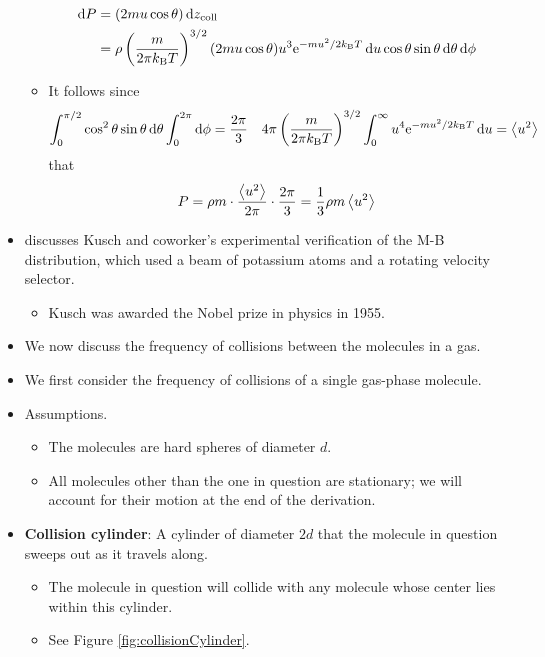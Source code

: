 \documentclass[../notes.tex]{subfiles}
\begin{document}
\begin{itemize}
\begin{itemize}
\begin{align*}
            \dd{P} &= (2mu\cos\theta)\dd{z_\text{coll}}\\
            &= \rho\left( \frac{m}{2\pi\kB T} \right)^{3/2}(2mu\cos\theta)u^3\e[-mu^2/2\kB T]\dd{u}\cos\theta\sin\theta\dd{\theta}\dd{\phi}
        \end{align*}
        \item It follows since
        \begin{align*}
            \int_0^{\pi/2}\cos^2\theta\sin\theta\dd{\theta}\int_0^{2\pi}\dd{\phi} &= \frac{2\pi}{3}&
            4\pi\left( \frac{m}{2\pi\kB T} \right)^{3/2}\int_0^\infty u^4\e[-mu^2/2\kB T]\dd{u} &= \prb{u^2}
        \end{align*}
        that
        \begin{equation*}
            P = \rho m\cdot\frac{\prb{u^2}}{2\pi}\cdot\frac{2\pi}{3}
            = \frac{1}{3}\rho m\prb{u^2}
        \end{equation*}
    \end{itemize}
    \item {}\textcite{bib:McQuarrieSimon} discusses Kusch and coworker's experimental verification of the M-B distribution, which used a beam of potassium atoms and a rotating velocity selector.
    \begin{itemize}
        \item Kusch was awarded the Nobel prize in physics in 1955.
    \end{itemize}
    \item We now discuss the frequency of collisions between the molecules in a gas.
    \item We first consider the frequency of collisions of a single gas-phase molecule.
    \item Assumptions.
    \begin{itemize}
        \item The molecules are hard spheres of diameter $d$.
        \item All molecules other than the one in question are stationary; we will account for their motion at the end of the derivation.
    \end{itemize}
    \item \textbf{Collision cylinder}: A cylinder of diameter $2d$ that the molecule in question sweeps out as it travels along.
    \begin{itemize}
        \item The molecule in question will collide with any molecule whose center lies within this cylinder.
        \item See Figure \ref{fig:collisionCylinder}.

\end{itemize}
\end{itemize}
\end{document}
